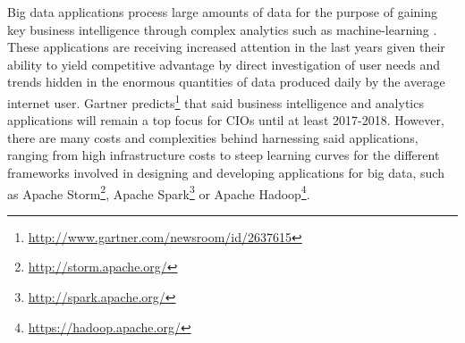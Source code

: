 
Big data applications process large amounts of data for the purpose of gaining key business intelligence through complex analytics such as machine-learning \cite{bdsurvey, ml4bd}. These applications are receiving increased attention in the last years given their ability to yield competitive advantage by direct investigation of user needs and trends hidden in the enormous quantities of data produced daily by the average internet user. Gartner predicts\footnote{\url{http://www.gartner.com/newsroom/id/2637615}} that said business intelligence and analytics applications will remain a top focus for CIOs until at least 2017-2018.
However, there are many costs and complexities behind harnessing said applications, ranging from high infrastructure costs to steep learning curves for the different frameworks involved in designing and developing applications for big data, such as Apache Storm\footnote{\url{http://storm.apache.org/}}, Apache Spark\footnote{\url{http://spark.apache.org/}} or Apache Hadoop\footnote{\url{https://hadoop.apache.org/}}.

